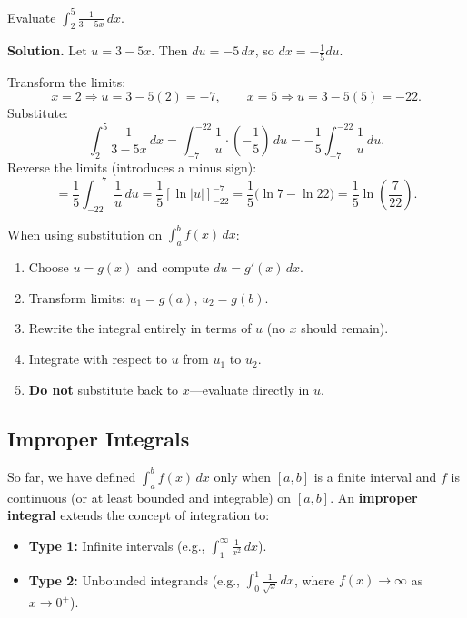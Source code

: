 \begin{examplebox}[title={Worked Example: $u$-substitution for definite integrals}]
Evaluate $\displaystyle \int_2^5 \frac{1}{3-5x}\,dx$.

\textbf{Solution.}
Let $u=3-5x$. Then $du=-5\,dx$, so $dx=-\frac{1}{5}du$.

Transform the limits:
\[
x=2 \Rightarrow u=3-5(2)=-7,\qquad x=5 \Rightarrow u=3-5(5)=-22.
\]
Substitute:
\[
\int_2^5 \frac{1}{3-5x}\,dx = \int_{-7}^{-22} \frac{1}{u}\cdot \left(-\frac{1}{5}\right)\,du = -\frac{1}{5}\int_{-7}^{-22} \frac{1}{u}\,du.
\]
Reverse the limits (introduces a minus sign):
\[
= \frac{1}{5}\int_{-22}^{-7} \frac{1}{u}\,du = \frac{1}{5}\left[\ln|u|\right]_{-22}^{-7} = \frac{1}{5}\bigl(\ln 7 - \ln 22\bigr)=\frac{1}{5}\ln\left(\frac{7}{22}\right).
\]
\end{examplebox}

\begin{examtip}[title={Exam Focus: Substitution workflow for definite integrals}]
When using substitution on $\int_a^b f(x)\,dx$:
\begin{enumerate}[label=(\arabic*), leftmargin=*]
\item Choose $u=g(x)$ and compute $du=g'(x)\,dx$.
\item Transform limits: $u_1=g(a)$, $u_2=g(b)$.
\item Rewrite the integral entirely in terms of $u$ (no $x$ should remain).
\item Integrate with respect to $u$ from $u_1$ to $u_2$.
\item \textbf{Do not} substitute back to $x$---evaluate directly in $u$.
\end{enumerate}
\end{examtip}

\newpage
\subsection{Improper Integrals}

So far, we have defined $\int_a^b f(x)\,dx$ only when $[a,b]$ is a finite interval and $f$ is continuous (or at least bounded and integrable) on $[a,b]$. An \textbf{improper integral} extends the concept of integration to:
\begin{itemize}
\item \textbf{Type 1:} Infinite intervals (e.g., $\int_1^\infty \frac{1}{x^2}\,dx$).
\item \textbf{Type 2:} Unbounded integrands (e.g., $\int_0^1 \frac{1}{\sqrt{x}}\,dx$, where $f(x)\to\infty$ as $x\to 0^+$).
\end{itemize}

